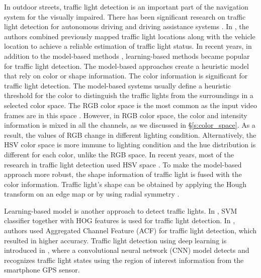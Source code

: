 In outdoor streets, traffic light detection is an important part of the navigation system for the visually impaired.
There has been significant research on traffic light detection for autonomous driving and driving assistance systems \cite{traffic_turan,selfdrive,traffic,traffic2,traffic3}.
In \cite{traffic_turan}, the authors combined previously mapped traffic light locations along with the vehicle location to achieve a reliable estimation of traffic light status.
In recent years, in addition to the model-based methods \cite{model,model2}, learning-based methods \cite{survey_traffic} became popular for traffic light detection.
The model-based approaches create a heuristic model that rely on color or shape information.
The color information is significant for traffic light detection.
The model-based systems usually define a heuristic threshold for the color to distinguish the traffic lights from the surroundings in a selected color space.
The RGB color space is the most common as the input video frames are in this space \cite{rgb2}.
However, in RGB color space, the color and intensity information is mixed in all the channels, as we discussed in \S\ref{s:color_space}.
As a result, the values of RGB change in different lighting condition.
Alternatively, the HSV color space is more immune to lighting condition and the hue distribution is different for each color, unlike the RGB space.
In recent years, most of the research in traffic light detection used HSV space \cite{hsv2}.
To make the model-based approach  more robust, the shape information of traffic light is fused with the color information.
Traffic light's shape can be obtained by applying the Hough transform on an edge map \cite{hough,hough2,signalguru} or by using radial symmetry \cite{radial,radial2}.

Learning-based model \cite{learning,learning2} is another approach to detect traffic lights.
In \cite{selfdrive}, SVM classifier together with HOG features is used for traffic light detection. 
In \cite{acf,acf2,lisa_cvpr}, authors used Aggregated Channel Feature (ACF) for traffic light detection, which resulted in higher accuracy.
Traffic light detection using deep learning is introduced in \cite{cnn,cnn2,cnn3}, where a convolutional neural network (CNN) model detects and recognizes traffic light states using the region of interest information from the smartphone GPS sensor.

